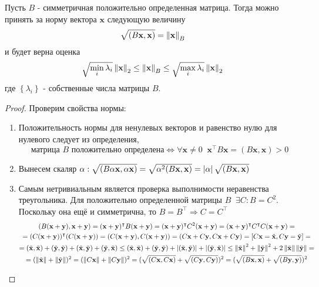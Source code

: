 \begin{theorem}
  Пусть $B$ - симметричная положительно определенная матрица. Тогда можно принять за норму вектора $\mathbf{x}$ следующую величину
  $$
    \sqrt{(B \mathbf{x}, \mathbf{x})} = \left\lVert\mathbf{\mathbf{x}}\right\rVert_{B}
  $$
  и будет верна оценка
  $$
    \sqrt{\min_i \lambda_i} \left\lVert\mathbf{x}\right\rVert_{2} \le \left\lVert\mathbf{\mathbf{x}}\right\rVert_{B} \le \sqrt{\max_i \lambda_i} \left\lVert\mathbf{x}\right\rVert_{2}
  $$
  где $\left\{\lambda_i\right\}$ - собственные числа матрицы $B$.

  \begin{proof}
    Проверим свойства нормы:
    \begin{enumerate}
      \item Положительность нормы для ненулевых векторов и равенство нулю для нулевого следует из определения,
            $$
              \text{матрица } B \text{ положительно определена} \Leftrightarrow \forall \mathbf{x} \neq 0 \;\; \mathbf{x}^\intercal B \mathbf{x} = (B\mathbf{x}, \mathbf{x}) > 0
            $$
      \item Вынесем скаляр $\alpha : \sqrt{(B\alpha\mathbf{x}, \alpha\mathbf{x})} = \sqrt{\alpha^2(B\mathbf{x}, \mathbf{x})} = \left\lvert\alpha\right\rvert\sqrt{(B\mathbf{x}, \mathbf{x})} $
      \item Самым нетривиальным является проверка выполнимости неравенства треугольника. Для положительно определенной матрицы $B \;\; \exists C : B = C^2$. Поскольку она ещё и симметрична, то $B = B^\intercal \Rightarrow C = C^\intercal$
            \begin{multline*}
              (B(\mathbf{x}+\mathbf{y}), \mathbf{x}+\mathbf{y}) =
              (\mathbf{x} + \mathbf{y})^\intercal B (\mathbf{x} + \mathbf{y}) =
              (\mathbf{x} + \mathbf{y})^\intercal C^2 (\mathbf{x} + \mathbf{y}) =
              (\mathbf{x} + \mathbf{y})^\intercal C^\intercal C (\mathbf{x} + \mathbf{y}) = \\
              = (C(\mathbf{x} + \mathbf{y}))^\intercal (C (\mathbf{x} + \mathbf{y})) =
              (C(\mathbf{x} + \mathbf{y}), C(\mathbf{x} + \mathbf{y})) =
              (C\mathbf{x} + C\mathbf{y}, C\mathbf{x} + C\mathbf{y}) = \left[C\mathbf{x} = \tilde{\mathbf{x}}, C\mathbf{y} = \tilde{\mathbf{y}}\right] = \\
              = (\tilde{\mathbf{x}}, \tilde{\mathbf{x}}) + (\tilde{\mathbf{y}}, \tilde{\mathbf{y}}) + (\tilde{\mathbf{x}}, \tilde{\mathbf{y}}) + (\tilde{\mathbf{y}}, \tilde{\mathbf{x}}) \le
              (\tilde{\mathbf{x}}, \tilde{\mathbf{x}}) + (\tilde{\mathbf{y}}, \tilde{\mathbf{y}}) + \left\lvert(\tilde{\mathbf{x}}, \tilde{\mathbf{y}})\right\rvert + \left\lvert(\tilde{\mathbf{y}}, \tilde{\mathbf{x}})\right\rvert \le
              \left\lVert\tilde{\mathbf{x}}\right\rVert^2 + \left\lVert\tilde{\mathbf{y}}\right\rVert^2 + 2\left\lVert\tilde{\mathbf{x}}\right\rVert\left\lVert\tilde{\mathbf{y}}\right\rVert = \\
              = (\left\lVert\tilde{\mathbf{x}}\right\rVert + \left\lVert\tilde{\mathbf{y}}\right\rVert)^2
              = (\left\lVert C\mathbf{x}\right\rVert + \left\lVert C\mathbf{y}\right\rVert)^2 =
              (\sqrt{(C\mathbf{x}, C\mathbf{x})} + \sqrt{(C\mathbf{y}, C\mathbf{y})})^2 =
              (\sqrt{(B\mathbf{x}, \mathbf{x})} + \sqrt{(B\mathbf{y}, \mathbf{y})})^2
            \end{multline*}


\end{enumerate}
\end{proof}
\end{theorem}
